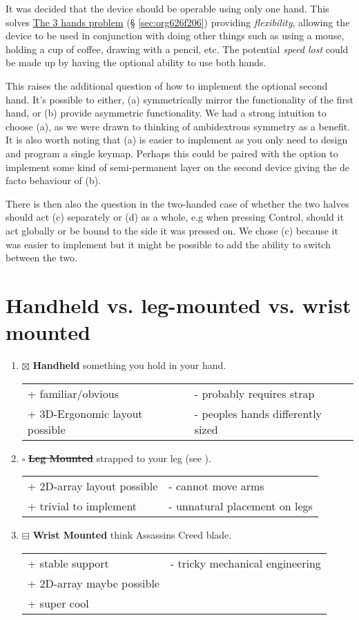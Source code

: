 \documentclass[logo,bsc,singlespacing,parskip]{infthesis}
\begin{document}
It was decided that the device should be operable using only one hand.
This solves \hyperref[sec:org626f206]{The 3 hands problem} (§ \ref{sec:org626f206}) providing \emph{flexibility}, allowing the device to be used in conjunction with doing other things such as using a mouse, holding a cup of coffee, drawing with a pencil, etc.
The potential \emph{speed lost} could be made up by having the optional ability to use both hands.

This raises the additional question of how to implement the optional second hand.
It's possible to either, (a) symmetrically mirror the functionality of the first hand, or (b) provide asymmetric functionality.
We had a strong intuition to choose (a), as we were drawn to thinking of ambidextrous symmetry as a benefit.
It is also worth noting that (a) is easier to implement as you only need to design and program a single keymap.
Perhaps this could be paired with the option to implement some kind of semi-permanent layer on the second device giving the de facto behaviour of (b).

There is then also the question in the two-handed case of whether the two halves should act (c) separately or (d) as a whole, e.g when pressing Control, should it act globally or be bound to the side it was pressed on.
We chose (c) because it was easier to implement but it might be possible to add the ability to switch between the two.
\section{Handheld vs. leg-mounted vs. wrist mounted}
\label{sec:org363408a}
\begin{enumerate}
\item{$\boxtimes$} \textbf{Handheld} something you hold in your hand.
\begin{longtable}{|p{6.25cm}|p{6.25cm}|}
\hline
+ familiar/obvious & - probably requires strap\\
+ 3D-Ergonomic layout possible & - peoples hands differently sized\\
\hline
\end{longtable}
\item{$\square$} \sout{\textbf{Leg Mounted}} strapped to your leg (see \autocite{SimulaVR2021}).
\begin{longtable}{|p{6.25cm}|p{6.25cm}|}
\hline
+ 2D-array layout possible & - cannot move arms\\
+ trivial to implement & - unnatural placement on legs\\
\hline
\end{longtable}
\item{$\boxminus$} \textbf{Wrist Mounted} think Assassins Creed blade.
\begin{longtable}{|p{6.25cm}|p{6.25cm}|}
\hline
+ stable support & - tricky mechanical engineering\\
+ 2D-array maybe possible & \\
+ super cool & \\
\hline
\end{longtable}
\end{enumerate}
\end{document}
